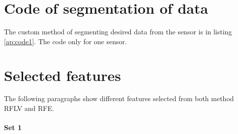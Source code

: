 \documentclass[USenglish]{ifimaster}  %
\begin{document}
\chapter{Code of segmentation of data} \label{ap:code}
The custom method of segmenting desired data from the sensor is in listing \ref{ap:code1}. The code only for one sensor.

\chapter{Selected features} \label{ap:self}
The following paragraphs show different features selected from both method RFLV and RFE.

\subsubsection{Set 1}
\end{document}
